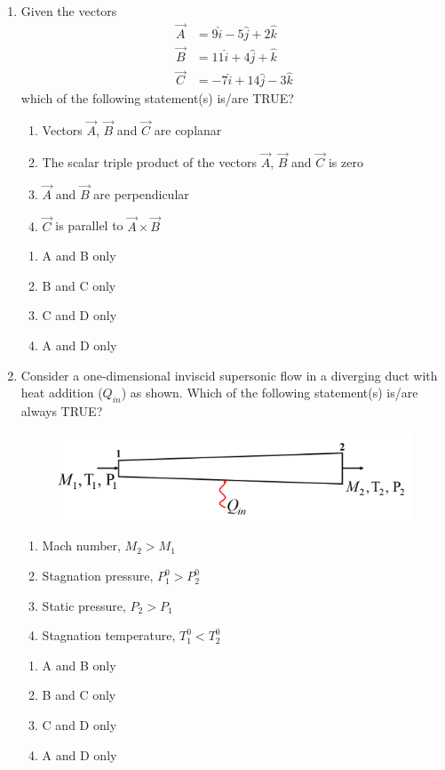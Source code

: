 \documentclass{article}
\begin{document}
\begin{enumerate}[leftmargin=*, resume]
\item Given the vectors 
\begin{align*}
\vec{A} &= 9\hat{i} - 5\hat{j} + 2\hat{k} \\
\vec{B} &= 11\hat{i} + 4\hat{j} + \hat{k} \\
\vec{C} &= -7\hat{i} + 14\hat{j} - 3\hat{k}
\end{align*}
which of the following statement(s) is/are TRUE?
\begin{enumerate}
\item Vectors $\vec{A}$, $\vec{B}$ and $\vec{C}$ are coplanar
\item The scalar triple product of the vectors $\vec{A}$, $\vec{B}$ and $\vec{C}$ is zero
\item $\vec{A}$ and $\vec{B}$ are perpendicular
\item $\vec{C}$ is parallel to $\vec{A} \times \vec{B}$
\end{enumerate}
\begin{multicols}{4}
\begin{enumerate}
\item A and B only
\item B and C only
\item C and D only
\item A and D only
\end{enumerate}
\end{multicols}

\item Consider a one-dimensional inviscid supersonic flow in a diverging duct with heat addition ($Q_{in}$) as shown. Which of the following statement(s) is/are always TRUE?
\begin{figure}[H]
    \centering
    \includegraphics[width=0.3\linewidth]{figs/Q44.png}
    \caption{}
    \label{fig:q44}
\end{figure}
\begin{enumerate}
\item Mach number, $M_2 > M_1$
\item Stagnation pressure, $P_1^0 > P_2^0$
\item Static pressure, $P_2 > P_1$
\item Stagnation temperature, $T_1^0 < T_2^0$
\end{enumerate}
\begin{multicols}{4}
\begin{enumerate}
\item A and B only
\item B and C only
\item C and D only
\item A and D only
\end{enumerate}
\end{multicols}


\end{enumerate}
\end{document}
